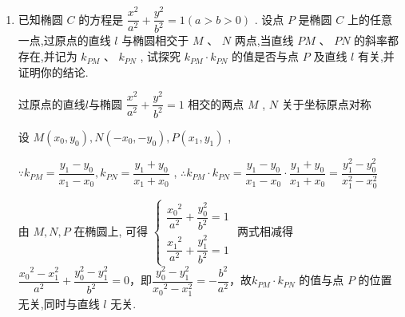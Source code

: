 \begin{enumerate}
\begin{enumerate}
        \item 已知椭圆 $C$ 的方程是 $\dfrac{{x}^{2}}{{a}^{2}} + \dfrac{{y}^{2}}{{b}^{2}} = 1\left( {a > b > 0}\right)$ . 设点 $P$ 是椭圆 $C$ 上的任意一点,过原点的直线 $l$ 与椭圆相交于 $M\text{ 、 }N$ 两点,当直线 ${PM}\text{ 、 }{PN}$ 的斜率都存在,并记为 ${k}_{PM}\text{ 、 }{k}_{PN}$ , 试探究 ${k}_{PM} \cdot  {k}_{PN}$ 的值是否与点 $P$ 及直线 $l$ 有关,并证明你的结论.
        \begin{jieda}
            过原点的直线$l$与椭圆 $ \dfrac{{x}^{2}}{a^2} + \dfrac{y^2}{b^2} = 1 $ 相交的两点 $ M $ , $ N $ 关于坐标原点对称
            
            设 $ M\left( {{x}_{0},{y}_{0}}\right) ,N\left( {-{x}_{0}, - {y}_{0}}\right) ,P\left( {x_1,y_1}\right) $ ,
            
            $ \because {k}_{PM} = \dfrac{y_1 - {y}_{0}}{x_1 - {x}_{0}},{k}_{PN} = \dfrac{y_1 + {y}_{0}}{x_1 + {x}_{0}} $ ,
            $ \therefore {k}_{PM} \cdot  {k}_{PN} = \dfrac{y_1 - {y}_{0}}{x_1 - {x}_{0}} \cdot  \dfrac{y_1 + {y}_{0}}{x_1 + {x}_{0}} = \dfrac{y_1^{2} - {y}_{0}^{2}}{x_1^{2} - {x}_{0}^{2}}$
            
            由 $ M,N,P $ 在椭圆上, 可得 $\left\{\begin{array}{l}
                \dfrac{{x_0}^{2}}{a^2} + \dfrac{y_0^2}{b^2} = 1  \\
                \dfrac{{x_1}^{2}}{a^2} + \dfrac{y_1^2}{b^2} = 1 
            \end{array}\right.$ 两式相减得 $\dfrac{{x_0}^{2}-x_1^2}{a^2} + \dfrac{y_0^2-y_1^2}{b^2} = 0$，即$\dfrac{y_0^2-y_1^2}{{x_0}^{2}-x_1^2} = -\dfrac{b^2}{a^2}$，故$ {k}_{PM} \cdot  {k}_{PN} $ 的值与点 $ P $ 的位置无关,同时与直线 $ l $ 无关.


\end{jieda}
\end{enumerate}
\end{enumerate}
